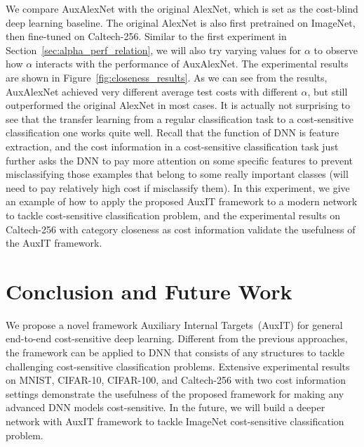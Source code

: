 \documentclass[a4paper]{article}
\begin{document}
  We compare AuxAlexNet with the original AlexNet, which is set as the cost-blind deep learning baseline.
  The original AlexNet is also first pretrained on ImageNet, then fine-tuned on Caltech-256.
  Similar to the first experiment in Section~\ref{sec:alpha_perf_relation}, we will also try varying values for $\alpha$ to observe how $\alpha$ interacts with the performance of AuxAlexNet.
  The experimental results are shown in Figure~\ref{fig:closeness_results}.
  As we can see from the results, AuxAlexNet achieved very different average test costs with different $\alpha$, but still outperformed the original AlexNet in most cases.
  It is actually not surprising to see that the transfer learning from a regular classification task to a cost-sensitive classification one works quite well.
  Recall that the function of DNN is feature extraction, and the cost information in a cost-sensitive classification task just further asks the DNN to pay more attention on some specific features to prevent misclassifying those examples that belong to some really important classes (will need to pay relatively high cost if misclassify them).
  In this experiment, we give an example of how to apply the proposed AuxIT framework to a modern network to tackle cost-sensitive classification problem, and the experimental results on Caltech-256 with category closeness as cost information validate the usefulness of the AuxIT framework.


\section{Conclusion and Future Work}
  \label{sec:con}
  We propose a novel framework Auxiliary Internal Targets~(AuxIT) for general end-to-end cost-sensitive deep learning.
  Different from the previous approaches, the framework can be applied to DNN that consists of any structures to tackle challenging cost-sensitive classification problems.
  Extensive experimental results on MNIST, CIFAR-10, CIFAR-100, and Caltech-256 with two cost information settings demonstrate the usefulness of the proposed framework for making any advanced DNN models cost-sensitive.
  In the future, we will build a deeper network with AuxIT framework to tackle ImageNet cost-sensitive classification problem.


\newpage
\eightpt



\end{document}
